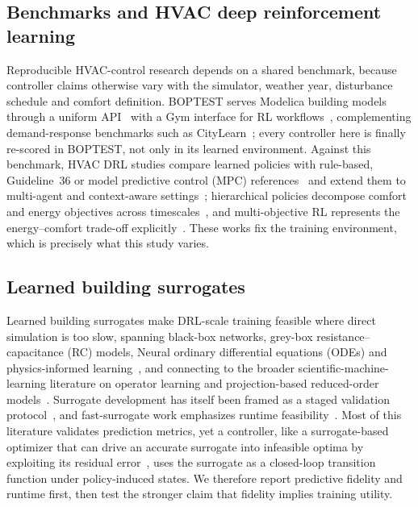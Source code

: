 \documentclass{ieeeaccess}
\begin{document}
\subsection{Benchmarks and HVAC deep reinforcement learning}
Reproducible HVAC-control research depends on a shared benchmark, because controller claims
otherwise vary with the simulator, weather year, disturbance schedule and comfort definition.
BOPTEST serves Modelica building models through a uniform
API~\cite{Blum2021BOPTEST,Wetter2014Modelica} with a Gym interface for RL
workflows~\cite{Arroyo2021GymBOPTEST}, complementing demand-response benchmarks such as
CityLearn~\cite{VazquezCanteli2019CityLearn,VazquezCanteli2019Review}; every controller here is
finally re-scored in BOPTEST, not only in its learned environment. Against this benchmark, HVAC DRL
studies compare learned policies with rule-based, Guideline~36 or model predictive control (MPC)
references~\cite{Savino2025ASHRAE,Wang2025SafeDRL,Nguyen2024Modelling,Sun2024DirectTSup} and extend
them to multi-agent and context-aware
settings~\cite{Deng2025MultiAgent,Alotaibi2025ContextAware}; hierarchical policies decompose
comfort and energy objectives across timescales~\cite{Liao2025HDRL,Bacon2017Options,Nachum2018HIRO},
and multi-objective RL represents the energy--comfort trade-off
explicitly~\cite{Yang2019MORL,Roijers2013MOSurvey,Hayes2022MOSurvey,Byeon2025MaxMinMORL}. These
works fix the training environment, which is precisely what this study varies.

\subsection{Learned building surrogates}
Learned building surrogates make DRL-scale training feasible where direct simulation is too slow,
spanning black-box networks, grey-box resistance--capacitance (RC) models, Neural ordinary differential equations (ODEs) and physics-informed
learning~\cite{Bacher2011RCIdentification,Berthou2014RC,Bunning2020RC,Picard2017WhiteBox,Raissi2019PINN,Chen2018NeuralODE,Karpatne2017TheoryGuided,Willard2022PIML,Hedayat2025PINN},
and connecting to the broader scientific-machine-learning literature on operator learning and
projection-based reduced-order models~\cite{Lu2021DeepONet,Li2021FNO,Benner2015ROM}. Surrogate
development has itself been framed as a staged validation protocol~\cite{HouEvins2024}, and
fast-surrogate work emphasizes runtime feasibility~\cite{Mshragi2026FastML}. Most of this literature
validates prediction metrics, yet a controller, like a surrogate-based optimizer that can drive an
accurate surrogate into infeasible optima by exploiting its residual error~\cite{Jones1998EGO}, uses
the surrogate as a closed-loop transition function under policy-induced states. We therefore report
predictive fidelity and runtime first, then test the stronger claim that fidelity implies training
utility.
\end{document}
